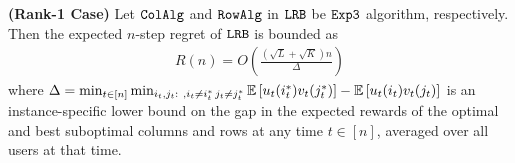 
\begin{theorem} \textbf{(Rank-1 Case)}
\label{thm:upper bound} Let ${\tt ColAlg}$ and ${\tt RowAlg}$ in ${\tt LRB}$ be ${\tt Exp3}$ algorithm, respectively. Then the expected $n$-step regret of ${\tt LRB}$ is bounded as
\begin{align*}
  R(n) = O\left(\frac{\left(\sqrt{L } + \sqrt{K }\right)n}{\Delta}\right)
\end{align*}
where $\Delta = \min_{t \in [n]} \min_{i_t,j_t:\ , i_t \neq i^*_t \, j_t \neq j^*_t} \mathbb{E}\left[u_t(i^*_t)v_t(j^*_t)\right] - \mathbb{E}\left[u_t(i_t)v_t(j_t)\right]$ is an instance-specific lower bound on the gap in the expected rewards of the optimal and best suboptimal columns and rows at any time $t \in [n]$, averaged over all users at that time.  


\end{theorem}
